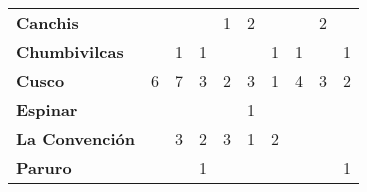 \begin{tabular}{lccccccccc}
	\textbf{Canchis}       & \cellcolor[HTML]{FCC46C}                    & \cellcolor[HTML]{FCC46C}  & \cellcolor[HTML]{FCC46C}                     & \cellcolor[HTML]{FCC46C}1                    & \cellcolor[HTML]{FCC46C}2                    & \cellcolor[HTML]{FCC46C}                    & \cellcolor[HTML]{FCC46C}                     & \cellcolor[HTML]{FCC46C}2                    & \cellcolor[HTML]{FCC46C} \\
	\textbf{Chumbivilcas}  & \cellcolor[HTML]{FCC46C}                    & 1                         & 1                                            & \cellcolor[HTML]{FCC46C}                     & \cellcolor[HTML]{FCC46C}                     & 1                                           & 1                                            & \cellcolor[HTML]{FCC46C}                     & \multicolumn{1}{l}{1}    \\
	\textbf{Cusco}         & \cellcolor[HTML]{FCC46C}6                   & \cellcolor[HTML]{FCC46C}7 & \cellcolor[HTML]{FCC46C}3                    & \cellcolor[HTML]{FCC46C}2                    & 3                                            & \cellcolor[HTML]{FCC46C}1                   & \cellcolor[HTML]{FCC46C}4                    & \cellcolor[HTML]{FCC46C}3                    & \multicolumn{1}{l}{2}    \\
	\textbf{Espinar}       & \cellcolor[HTML]{FCC46C}                    & \cellcolor[HTML]{FCC46C}  & \cellcolor[HTML]{FCC46C}                     & \cellcolor[HTML]{FCC46C}                     & 1                                            & \cellcolor[HTML]{FCC46C}                    & \cellcolor[HTML]{FCC46C}                     & \cellcolor[HTML]{FCC46C}                     & \cellcolor[HTML]{FCC46C} \\
	\textbf{La Convención} & \cellcolor[HTML]{FCC46C}                    & \cellcolor[HTML]{FCC46C}3 & 2                                            & \cellcolor[HTML]{FCC46C}3                    & \cellcolor[HTML]{FCC46C}1                    & \cellcolor[HTML]{FCC46C}2                   & \cellcolor[HTML]{FCC46C}                     & \cellcolor[HTML]{FCC46C}                     & \cellcolor[HTML]{FCC46C} \\
	\textbf{Paruro}        & \cellcolor[HTML]{FCC46C}                    & \cellcolor[HTML]{FCC46C}  & \cellcolor[HTML]{FCC46C}1                    & \cellcolor[HTML]{FCC46C}                     & \cellcolor[HTML]{FCC46C}                     & \cellcolor[HTML]{FCC46C}                    & \cellcolor[HTML]{FCC46C}                     & \cellcolor[HTML]{FCC46C}                     & \multicolumn{1}{l}{1}    \\

\end{tabular}
